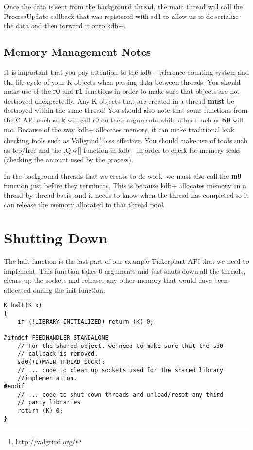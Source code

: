 Once the data is sent from the background thread, the main thread will call the ProcessUpdate callback that was registered
with sd1 to allow us to de-serialize the data and then forward it onto kdb+.

\subsection{Memory Management Notes}

It is important that you pay attention to the kdb+ reference counting system
and the life cycle of your K objects when passing data between threads. You should make use of the \textbf{r0} and \textbf{r1} functions in order to make sure that objects are not destroyed unexpectedly. Any K objects that are created in a thread \textbf{must} be destroyed within the same
thread! You should also note that some functions from the C API such as \textbf{k} will call r0 on their arguments while others such as \textbf{b9} will not. Because of the way kdb+ allocates memory, it can make traditional leak checking tools such as Valigrind\footnote{http://valgrind.org/} less effective. You should make use of tools such as top/free and the .Q.w[] function in kdb+ in order to check for memory leaks
(checking the amount used by the process).

In the background threads that we create to do work, we must also call the \textbf{m9} function just before they terminate. This is because kdb+ allocates memory on a thread by thread basis, and it needs to know when the thread has completed so it can release the memory allocated to that thread pool.

\section{Shutting Down}

The halt function is the last part of our example Tickerplant API that we need to implement. This function takes 0 arguments
and just shuts down all the threads, cleans up the sockets and releases any other memory that would have been allocated during
the init function.

\begin{lstlisting}
K halt(K x)
{
	if (!LIBRARY_INITIALIZED) return (K) 0;

#ifndef FEEDHANDLER_STANDALONE
	// For the shared object, we need to make sure that the sd0
	// callback is removed.
	sd0((I)MAIN_THREAD_SOCK);
	// ... code to clean up sockets used for the shared library
	//implementation.
#endif
	// ... code to shut down threads and unload/reset any third
	// party libraries
	return (K) 0;
}
\end{lstlisting}

